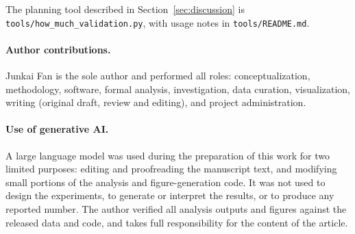 \documentclass{comjnl}
\begin{document}
\noindent The planning tool described in Section~\ref{sec:discussion} is \texttt{tools/how\_much\_validation.py}, with usage notes in \texttt{tools/README.md}.

\paragraph{Author contributions.} Junkai Fan is the sole author and performed all roles: conceptualization, methodology, software, formal analysis, investigation, data curation, visualization, writing (original draft, review and editing), and project administration.

\paragraph{Use of generative AI.} A large language model was used during the preparation of this work for two limited purposes: editing and proofreading the manuscript text, and modifying small portions of the analysis and figure-generation code. It was not used to design the experiments, to generate or interpret the results, or to produce any reported number. The author verified all analysis outputs and figures against the released data and code, and takes full responsibility for the content of the article.



\end{document}
